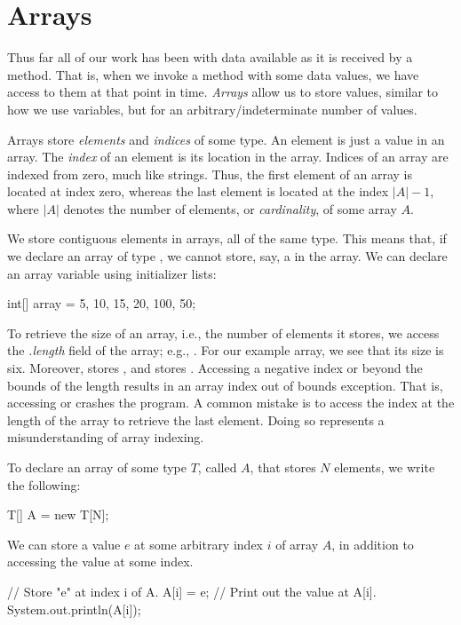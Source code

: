 \section{Arrays}

Thus far all of our work has been with data available as it is received by a method. That is, when we invoke a method with some data values, we have access to them at that point in time. \emph{Arrays} allow us to store values, similar to how we use variables, but for an arbitrary/indeterminate number of values.

Arrays store \emph{elements} and \emph{indices} of some type. An element is just a value in an array. The \emph{index} of an element is its location in the array. Indices of an array are indexed from zero, much like strings. Thus, the first element of an array is located at index zero, whereas the last element is located at the index $|A| - 1$, where $|A|$ denotes the number of elements, or \emph{cardinality}, of some array $A$.

We store contiguous elements in arrays, all of the same type. This means that, if we declare an array of type , we cannot store, say, a  in the array. We can declare an array variable using initializer lists:
\begin{verbnobox}[\small]
int[] array = {5, 10, 15, 20, 100, 50};
\end{verbnobox}
To retrieve the size of an array, i.e., the number of elements it stores, we access the \emph{.length} field of the array; e.g., . For our example array, we see that its size is six. Moreover,  stores , and  stores . Accessing a negative index or beyond the bounds of the length results in an array index out of bounds exception. That is, accessing  or  crashes the program. A common mistake is to access the index at the length of the array to retrieve the last element. Doing so represents a misunderstanding of array indexing.

To declare an array of some type $T$, called $A$, that stores $N$ elements, we write the following:
\begin{verbnobox}[\small]
T[] A = new T[N];
\end{verbnobox}
We can store a value $e$ at some arbitrary index $i$ of array $A$, in addition to accessing the value at some index.
\begin{verbnobox}[\small]
// Store "e" at index i of A.
A[i] = e;
// Print out the value at A[i].
System.out.println(A[i]);
\end{verbnobox}

